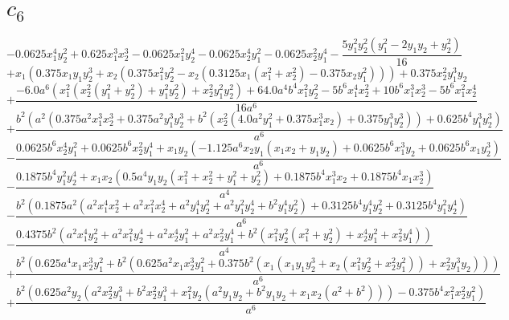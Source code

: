 \section{$c_6$}

$$- 0.0625 x_{1}^{4} y_{2}^{2} + 0.625 x_{1}^{3} x_{2}^{3} - 0.0625 x_{1}^{2} y_{2}^{4} - 0.0625 x_{2}^{4} y_{1}^{2} - 0.0625 x_{2}^{2} y_{1}^{4} - \frac{5 y_{1}^{2} y_{2}^{2} \left(y_{1}^{2} - 2 y_{1} y_{2} + y_{2}^{2}\right)}{16}$$
$$+x_{1} \left(0.375 x_{1} y_{1} y_{2}^{3} + x_{2} \left(0.375 x_{1}^{2} y_{2}^{2} - x_{2} \left(0.3125 x_{1} \left(x_{1}^{2} + x_{2}^{2}\right) - 0.375 x_{2} y_{1}^{2}\right)\right)\right) + 0.375 x_{2}^{2} y_{1}^{3} y_{2}$$
$$+\frac{- 6.0 a^{6} \left(x_{1}^{2} \left(x_{2}^{2} \left(y_{1}^{2} + y_{2}^{2}\right) + y_{1}^{2} y_{2}^{2}\right) + x_{2}^{2} y_{1}^{2} y_{2}^{2}\right) + 64.0 a^{4} b^{4} x_{1}^{2} y_{2}^{2} - 5 b^{6} x_{1}^{4} x_{2}^{2} + 10 b^{6} x_{1}^{3} x_{2}^{3} - 5 b^{6} x_{1}^{2} x_{2}^{4}}{16 a^{6}}$$
$$+\frac{b^{2} \left(a^{2} \left(0.375 a^{2} x_{1}^{3} x_{2}^{3} + 0.375 a^{2} y_{1}^{3} y_{2}^{3} + b^{2} \left(x_{2}^{2} \left(4.0 a^{2} y_{1}^{2} + 0.375 x_{1}^{3} x_{2}\right) + 0.375 y_{1}^{3} y_{2}^{3}\right)\right) + 0.625 b^{4} y_{1}^{3} y_{2}^{3}\right)}{a^{6}}$$
$$- \frac{0.0625 b^{6} x_{2}^{4} y_{1}^{2} + 0.0625 b^{6} x_{2}^{2} y_{1}^{4} + x_{1} y_{2} \left(- 1.125 a^{6} x_{2} y_{1} \left(x_{1} x_{2} + y_{1} y_{2}\right) + 0.0625 b^{6} x_{1}^{3} y_{2} + 0.0625 b^{6} x_{1} y_{2}^{3}\right)}{a^{6}}$$
$$- \frac{0.1875 b^{4} y_{1}^{2} y_{2}^{4} + x_{1} x_{2} \left(0.5 a^{4} y_{1} y_{2} \left(x_{1}^{2} + x_{2}^{2} + y_{1}^{2} + y_{2}^{2}\right) + 0.1875 b^{4} x_{1}^{3} x_{2} + 0.1875 b^{4} x_{1} x_{2}^{3}\right)}{a^{4}}$$
$$- \frac{b^{2} \left(0.1875 a^{2} \left(a^{2} x_{1}^{4} x_{2}^{2} + a^{2} x_{1}^{2} x_{2}^{4} + a^{2} y_{1}^{4} y_{2}^{2} + a^{2} y_{1}^{2} y_{2}^{4} + b^{2} y_{1}^{4} y_{2}^{2}\right) + 0.3125 b^{4} y_{1}^{4} y_{2}^{2} + 0.3125 b^{4} y_{1}^{2} y_{2}^{4}\right)}{a^{6}}$$
$$- \frac{0.4375 b^{2} \left(a^{2} x_{1}^{4} y_{2}^{2} + a^{2} x_{1}^{2} y_{2}^{4} + a^{2} x_{2}^{4} y_{1}^{2} + a^{2} x_{2}^{2} y_{1}^{4} + b^{2} \left(x_{1}^{2} y_{2}^{2} \left(x_{1}^{2} + y_{2}^{2}\right) + x_{2}^{4} y_{1}^{2} + x_{2}^{2} y_{1}^{4}\right)\right)}{a^{4}}$$
$$+\frac{b^{2} \left(0.625 a^{4} x_{1} x_{2}^{3} y_{1}^{2} + b^{2} \left(0.625 a^{2} x_{1} x_{2}^{3} y_{1}^{2} + 0.375 b^{2} \left(x_{1} \left(x_{1} y_{1} y_{2}^{3} + x_{2} \left(x_{1}^{2} y_{2}^{2} + x_{2}^{2} y_{1}^{2}\right)\right) + x_{2}^{2} y_{1}^{3} y_{2}\right)\right)\right)}{a^{6}}$$
$$+\frac{b^{2} \left(0.625 a^{2} y_{2} \left(a^{2} x_{2}^{2} y_{1}^{3} + b^{2} x_{2}^{2} y_{1}^{3} + x_{1}^{2} y_{2} \left(a^{2} y_{1} y_{2} + b^{2} y_{1} y_{2} + x_{1} x_{2} \left(a^{2} + b^{2}\right)\right)\right) - 0.375 b^{4} x_{1}^{2} x_{2}^{2} y_{1}^{2}\right)}{a^{6}}$$
